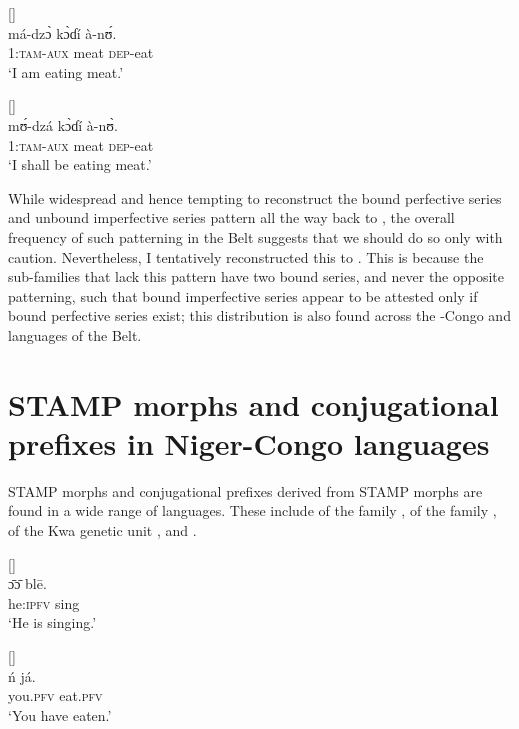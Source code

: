 \documentclass[output=paper]{langsci/langscibook}
\begin{document}
\ea\label{ex:anderson:64}
 \citep[51]{TuckerBryan1966}        []\\
\gll má-dz\`ɔ    k\`ɔɗí  à-n\'ʊ.   \\
1:\textsc{tam-aux}  meat  \textsc{dep}-eat   \\
\glt `I am eating meat.'   
\z

\ea\label{ex:anderson:65}
 \citep[51]{TuckerBryan1966}        []\\
\gll m\'ʊ-dzá    k\`ɔɗí  à-n\`ʊ.\\
1:\textsc{tam-aux}  meat  \textsc{dep}-eat\\
\glt `I shall be eating meat.'  
\z

While widespread and hence tempting to reconstruct the bound perfective series and unbound imperfective series pattern all the way back to , the overall frequency of such patterning in the  Belt suggests that we should do so only with caution. Nevertheless, I tentatively reconstructed this to  \citep{Anderson2015}. This is because the sub-families that lack this pattern have two bound series, and never the opposite patterning, such that bound imperfective series appear to be attested only if bound perfective series exist; this distribution is also found across the -Congo and  languages of the  Belt.

\section{STAMP morphs and conjugational prefixes in {Niger-Congo} languages}\label{sec:Anderson:9}

STAMP morphs and conjugational prefixes derived from STAMP morphs are found in a wide range of  languages. These include  of the  family ,  of the  family ,  of the  Kwa genetic unit , and  .

\ea\label{ex:anderson:66}
 \citep[3, 18]{Marchese1982}            []\\
\gll \={ɔ}\={ɔ}    bl\={e}.  \\
he\textsc{:ipfv}   sing\\
\glt `He is singing.'
\z

  
\ea\label{ex:anderson:67}
   \citep[196]{Jungraithmayr1968}        []\\
\gll \'{n}    já.   \\
you\textsc{.pfv}  eat.\textsc{pfv} \\
\glt `You have eaten.'
\z
\end{document}
